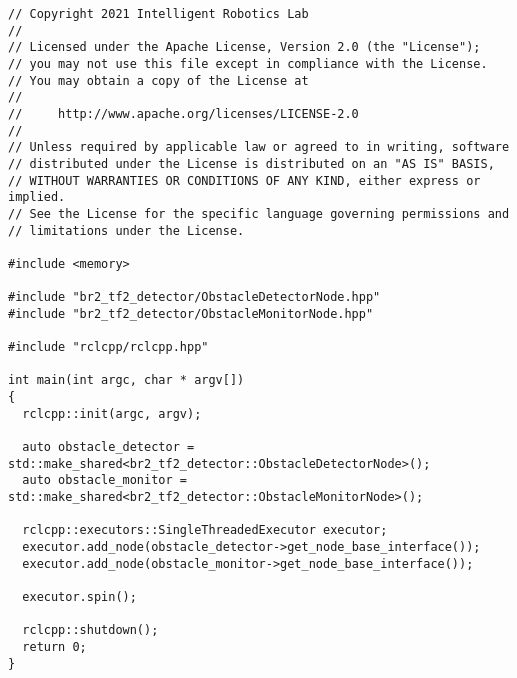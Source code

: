  \footnotesize
\begin{tcolorbox}[sharp corners, colframe=gray!80, colback=LightGray, left=0pt, top=0pt, bottom=0pt, title=\texttt{br2\_tf2\_detector/src/detector\_main.cpp}]
  \begin{verbatim}
// Copyright 2021 Intelligent Robotics Lab
//
// Licensed under the Apache License, Version 2.0 (the "License");
// you may not use this file except in compliance with the License.
// You may obtain a copy of the License at
//
//     http://www.apache.org/licenses/LICENSE-2.0
//
// Unless required by applicable law or agreed to in writing, software
// distributed under the License is distributed on an "AS IS" BASIS,
// WITHOUT WARRANTIES OR CONDITIONS OF ANY KIND, either express or implied.
// See the License for the specific language governing permissions and
// limitations under the License.

#include <memory>

#include "br2_tf2_detector/ObstacleDetectorNode.hpp"
#include "br2_tf2_detector/ObstacleMonitorNode.hpp"

#include "rclcpp/rclcpp.hpp"

int main(int argc, char * argv[])
{
  rclcpp::init(argc, argv);

  auto obstacle_detector = std::make_shared<br2_tf2_detector::ObstacleDetectorNode>();
  auto obstacle_monitor = std::make_shared<br2_tf2_detector::ObstacleMonitorNode>();

  rclcpp::executors::SingleThreadedExecutor executor;
  executor.add_node(obstacle_detector->get_node_base_interface());
  executor.add_node(obstacle_monitor->get_node_base_interface());

  executor.spin();

  rclcpp::shutdown();
  return 0;
}
    \end{verbatim}
    \end{tcolorbox}
  \normalsize

